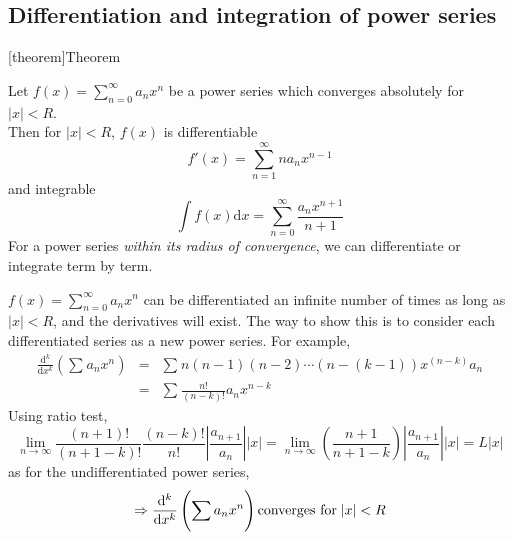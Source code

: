 \documentclass[12pt]{report}
\theoremstyle{definition}
\begin{document}
\subsection{Differentiation and integration of power series}
[theorem]{Theorem}
\begin{diff and int of power series}
    Let $f(x) = \sum_{n=0}^{\infty} a_n x^{n}$ be a power series which converges absolutely for $|x| < R$.
    \\Then for $|x| < R$, $f(x)$ is differentiable\[
        f'(x) = \sum_{n=1}^{\infty} n a_n x^{n-1}
    \]and integrable\[
    \int f(x)\mathrm{d}x = \sum_{n=0}^{\infty} \frac{a_n x^{n+1}}{n+1}
    \]
    For a power series \emph{within its radius of convergence}, we can differentiate or integrate term by term.
\end{diff and int of power series}
\begin{notes}
    $f(x) = \sum_{n=0}^{\infty} a_n x^{n}$ can be differentiated an infinite number of times as long as $|x| < R$, 
    and the derivatives will exist.
    The way to show this is to consider each differentiated series as a new power series. For example,
    \begin{eqnarray*}
        \frac{\mathrm{d}^{k}}{\mathrm{d}x^{k}} \left(\sum_{}^{} a_n x^{n}\right)
        &=& \sum_{}^{} n(n-1)(n-2)\cdots(n-(k-1))x^{(n-k)}a_n \\
        &=& \sum_{}^{} \frac{n!}{(n-k)!} a_n x^{n-k}
    \end{eqnarray*}
    Using ratio test,\[
        \lim_{n\rightarrow\infty} \frac{(n+1)!}{(n+1-k)!} \frac{(n-k)!}{n!} \left|\frac{a_{n+1}}{a_n}\right| |x|
        = \lim_{n\rightarrow\infty} \left(\frac{n+1}{n+1-k}\right) \left|\frac{a_{n+1}}{a_n}\right| |x|
        = L|x|
    \]as for the undifferentiated power series,\[
    \Rightarrow \frac{\mathrm{d}^{k}}{\mathrm{d}x^{k}} \left(\sum_{}^{} a_n x^{n}\right) 
    \textnormal{converges for} \;|x| < R
    \]
\end{notes}
\end{document}
